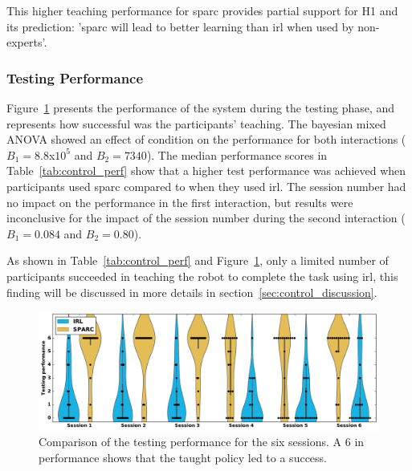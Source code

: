 This higher teaching performance for \gls{sparc} provides partial support for H1 and its prediction: '\gls{sparc} will lead to better learning
than \gls{irl} when used by non-experts'.

\subsubsection{Testing Performance}

Figure~\ref{fig:control_perf} presents the performance of the system during the testing phase, and represents how successful was the participants' teaching. The bayesian mixed ANOVA showed an effect of condition on the performance for both interactions ($B_1=8.8$x$10^5$ and $B_2 = 7340$). The median performance scores in Table~\ref{tab:control_perf} show that a higher test performance was achieved when participants used \gls{sparc} compared to when they used \gls{irl}. The session number had no impact on the performance in the first interaction, but results were inconclusive for the impact of the session number during the second interaction ($B_1=0.084$ and $B_2=0.80$).


As shown in Table~\ref{tab:control_perf} and Figure~\ref{fig:control_perf}, only a limited number of participants succeeded in teaching the robot to complete the task using \gls{irl}, this finding will be discussed in more details in section~\ref{sec:control_discussion}.


\begin{figure}[ht]
	\includegraphics[width=\textwidth]{performance.pdf}
	\centering
	\caption{Comparison of the testing performance for the six sessions. A 6 in performance shows that the taught policy led to a success.
	}
	\label{fig:control_perf}
\end{figure}

